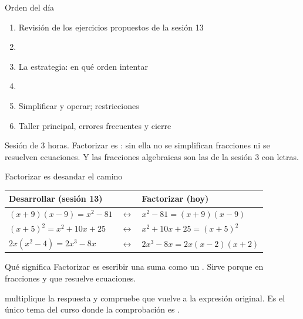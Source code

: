 \documentclass[aspectratio=169,10pt]{beamer}
\begin{document}
\portada

\begin{frame}{Orden del día}
  \begin{enumerate}
    \item Revisión de los ejercicios propuestos de la sesión 13
    \item {}
    \item La estrategia: en qué orden intentar
    \item {}
    \item Simplificar y operar; restricciones
    \item Taller principal, errores frecuentes y cierre
  \end{enumerate}

  \vspace{0.25cm}
  {\footnotesize\color{uniGris} Sesión de 3 horas. Factorizar es
  : sin ella no se
  simplifican fracciones ni se resuelven ecuaciones. Y las fracciones
  algebraicas son las de la sesión 3 con letras.}
\end{frame}


\begin{frame}{Factorizar es desandar el camino}
  \scriptsize
  \begin{center}
  \begin{tabular}{@{}p{5.0cm}p{1.4cm}p{5.2cm}@{}}
    \toprule
    \textbf{Desarrollar (sesión 13)} & &
    \textbf{Factorizar (hoy)} \\
    \midrule
    $(x+9)(x-9) = x^{2}-81$ & $\longleftrightarrow$ &
      $x^{2}-81 = (x+9)(x-9)$ \\
    $(x+5)^{2} = x^{2}+10x+25$ & $\longleftrightarrow$ &
      $x^{2}+10x+25 = (x+5)^{2}$ \\
    $2x(x^{2}-4) = 2x^{3}-8x$ & $\longleftrightarrow$ &
      $2x^{3}-8x = 2x(x-2)(x+2)$ \\
    \bottomrule
  \end{tabular}
  \end{center}

  \vspace{0.12cm}
  \begin{block}{Qué significa}
    \tiny
    Factorizar es escribir una suma como un . Sirve porque
     en fracciones y
     que resuelve ecuaciones.
  \end{block}

  \vspace{0.08cm}
  {\tiny\color{uniGris}  multiplique la
  respuesta y compruebe que vuelve a la expresión original. Es el único tema
  del curso donde la comprobación es .}
\end{frame}
\end{document}
